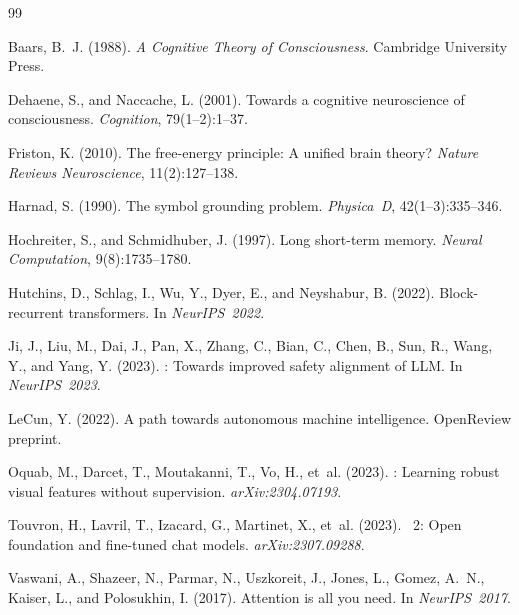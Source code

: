 \documentclass[12pt,a4paper]{article}
\begin{document}
\begin{thebibliography}{99}

Baars, B.~J. (1988).
\newblock \textit{A Cognitive Theory of Consciousness}.
\newblock Cambridge University Press.

Dehaene, S., and Naccache, L. (2001).
\newblock Towards a cognitive neuroscience of consciousness.
\newblock \textit{Cognition}, 79(1--2):1--37.

Friston, K. (2010).
\newblock The free-energy principle: A unified brain theory?
\newblock \textit{Nature Reviews Neuroscience}, 11(2):127--138.

Harnad, S. (1990).
\newblock The symbol grounding problem.
\newblock \textit{Physica~D}, 42(1--3):335--346.

Hochreiter, S., and Schmidhuber, J. (1997).
\newblock Long short-term memory.
\newblock \textit{Neural Computation}, 9(8):1735--1780.

Hutchins, D., Schlag, I., Wu, Y., Dyer, E., and Neyshabur, B. (2022).
\newblock Block-recurrent transformers.
\newblock In \textit{NeurIPS~2022}.

Ji, J., Liu, M., Dai, J., Pan, X., Zhang, C., Bian, C., Chen, B., Sun, R.,
  Wang, Y., and Yang, Y. (2023).
: Towards improved safety alignment of {LLM}.
\newblock In \textit{NeurIPS~2023}.

LeCun, Y. (2022).
\newblock A path towards autonomous machine intelligence.
\newblock OpenReview preprint.

Oquab, M., Darcet, T., Moutakanni, T., Vo, H., et~al. (2023).
: Learning robust visual features without supervision.
\newblock \textit{arXiv:2304.07193}.

Touvron, H., Lavril, T., Izacard, G., Martinet, X., et~al. (2023).
~2: Open foundation and fine-tuned chat models.
\newblock \textit{arXiv:2307.09288}.

Vaswani, A., Shazeer, N., Parmar, N., Uszkoreit, J., Jones, L., Gomez, A.~N.,
  Kaiser, L., and Polosukhin, I. (2017).
\newblock Attention is all you need.
\newblock In \textit{NeurIPS~2017}.

\end{thebibliography}
\end{document}

